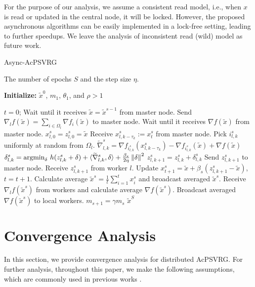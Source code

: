 For the purpose of our analysis, we assume a consistent read model, i.e., when $x$ is read or updated in the central node, it will be locked. However, the proposed asynchronous algorithms can be easily implemented in a lock-free setting, leading to further speedups. We leave the analysis of inconsistent read (wild) model as future work.
\begin{algorithm}[H]
\caption{Async-AcPSVRG}\label{AsyncVR-Algo}
\begin{algorithmic}
\renewcommand{\algorithmicrequire}{\textbf{Input:}}
 \renewcommand{\algorithmicensure}{\textbf{Output:}}
  \newcommand{\INITIALIZE}{\item[\textbf{Initialize:}]}
\REQUIRE The number of epochs $S$ and the step size $\eta$.
\INITIALIZE  $\widetilde{x}^0$, $m_1$, $\theta_1$, and $\rho > 1$

\STATE $t=0$;
\STATE Wait until it receives $\widetilde{x} = \widetilde{x}^{s-1}$ from master node.
\STATE  Send $\nabla_l f(\widetilde{x}) = \sum_{i\in\Omega_l}\nabla f_i(\widetilde{x})$ to master node.
\STATE  Wait until it receives $\nabla f(\widetilde{x})$ from master node.
\STATE $x_{l,0}^s = z_{l,0}^s = \widetilde{x}$
 \STATE Receive $x_{l,k-\tau_k}^s:=x_{t}^s$ from master node.
 \STATE Pick $i_{l,k}^s$ uniformly at random from $\Omega_l$.
 \STATE $\widetilde{\nabla}_{l,k}^s = \nabla f_{i_{l,k}^s}(x_{l,k-\tau_k}^s) - \nabla f_{i_{l,k}^s}(\widetilde{x}) + \nabla f(\widetilde{x})$
 \STATE $\delta_{l,k}^s = \text{argmin}_{\delta}\,\,h(z_{l,k}^s+\delta)+\langle\widetilde{\nabla}_{l,k}^s,\delta\rangle + \frac{{\beta_s}}{2\eta}\left\lVert\delta\right\rVert^2$
 \STATE $z_{l,k+1}^s = z_{l,k}^s + \delta_{l,k}^s$
 \STATE Send $z_{l,k+1}^s$ to master node.
 \STATE Receive $z_{l,k+1}^s$ from worker $l$. 
  \STATE Update $x^s_{t+1} = \widetilde{x}+\beta_s(z_{l,k+1}^s-\widetilde{x})$, $t=t+1$.
  \ENDFOR
   \STATE Calculate average $\widetilde{x}^s = \frac{1}{t}\sum_{i=1}^{t} x_{i}^s$ and broadcast averaged $\widetilde{x}^s$. 
  \STATE Receive $\nabla_l f(\widetilde{x}^s)$ from workers and calculate average $\nabla f(\widetilde{x}^s)$.
  \STATE Broadcast averaged $\nabla f(\widetilde{x}^s)$ to local workers.
  \STATE $m_{s+1} = \gamma m_s$
  \ENDFOR
 \ENSURE $\widetilde{x}^S$
\end{algorithmic}
\end{algorithm}

\section{Convergence Analysis}
In this section, we provide convergence analysis for distributed AcPSVRG. For further analysis, throughout this paper, we make the following assumptions, which are commonly used in previous works \cite{Reddi2015,Meng2016}.

